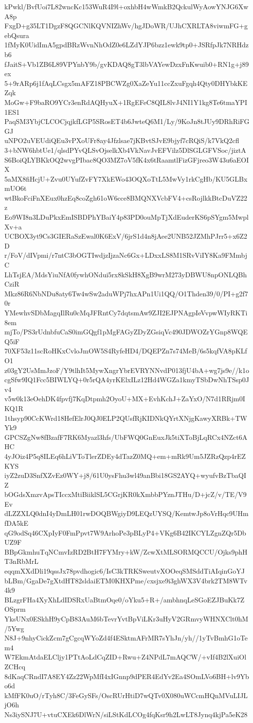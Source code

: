kPwkl/BvfUoi7L82wncKc153WuR4I9l+oxhbH4wWmkB2QckulWyAowYNJG6XwA8p
FxgD+g35LT1DgzF8QGCNlKQVNIZhWv/hgJDoWR/UJhCXRLTA8viwmFG+gebQsura
1fMyK0UidImA5gpdBRzWvnNhOdZ0e6LZdYJP6bzz1ewk9tp0+JSRfpJk7NRHdzb6
fJaitS+Vb1ZB6L89VPYnbY9b/gvKDAQ8gT3lbVAYewDzxFnKwuib0+RN1g+j89ex
5+9rARp6j1fAqLCsgx5mAFZ18PBCWZg0XaZeYu11ccZxuFgqh4Qty0DHYbkKEZqk
MoGw+F9baRO9YCr3enRdAQHyuX+1RgEFeC8QIL8lvJ4NI1Y1kg8Te6tmaYPI1ES1
PaqSM3YbjCLCOCjqjkfLGP5SRosET4b6JwteQ6M1/Ly/9KoJn8tJUy9DRhRiFGGJ
uNPO2uVEUdiQEu3vPXoUFr8ay4Jfzlsae7jKBvtSJvE9bjyf7cRQiS/k7VkQ2cfl
3+bNW6hbtUe1/qlsdPYvQLSvOjselkXb4VkNavJvEFVilz5DlSGLGFVSoc/jiztA
S6BoiQLYBKkOQ2wvgPIbac8QO3MZ7oV5fK4x6tRaamtlFizGFjreo3W43u6aEOIX
5aMX8fiHcjU+Zvu0UYufZvFY7XkEWo43OQXoTtL5MwVy1rkCgHb/KU5GLBxmUO6t
wtBkoFciFnXEux0hzEq8coZgh61oW6cce8BMQNXVcbFV4+csRojlkkBtcDuVZ22z
Eo9WI8n3LDuPkxEmISBDPhYBaiY4p83PD0ouMpTjXdEuderKS6pSYgm5MwplXv+a
UCBOX3yt9Cs3GIERaSzEwal0K6ExV/6jrS1d4n8jAee2UNB52JZMhPJrr5+x6Z2D
r/FoV/dIVpmi/r7ntC3bOGTIwdjzIjzaNc6Gx+LDxxLS8M1SRvViIY8Ka9FMmbjC
LhTsjEA/MdsYiuNfA0fywhONdui5rx8kSkH8XgB9wrM273yDBWU8npONLQBhCziR
Mkz86R6NbNDu8aty6Tw4wSw2aduWPj7hxAPn1Ui1QQ/O1Thden39/0/PI+g2f70r
YMewhvSDbMagqIlRu0cMqJFRntCy7dqtsmAw9ZJI2EJPNAgpIeVvpwWIyRKTi8em
mjTo/PS3rUdnbfuCaS0imGQgf1pMgFAGyZDyZGsiqVc490JDWOZrYGnp8WQEQ5iF
70XF53z11scRoHKxCvloJmOW5S4RyfeHD4/DQEPZn7s74MeB/6s5kqfVA8pKLfO1
z03gY2UsMmJzoF/Y9tlhIt5MywXngrYbrEVRYNNvdP013fjU4bA+wg7js9e//k1o
cgSfw9IQ1Fcc5BIWLYQ+0r5rQA4yrKElxILz12Hd4WGZa1kmyTSbDwNhTSsp0Jv4
v5w0k13eOehDK4fpvfj7KqDtpmh2OyoU+MX+EvhKchJ+ZaYxO/N7d1RRjm0IKQ1R
1thsyp90CcKWrd18HefElrJ0QJ0ELP2QUsfRjKIDNkQYrtXNjgKawyXRBk+TWYk9
GPCSZgNw8fBzafF7RK6Myazl3hfs/UbFWQ0GnEuxJk5tiXToBjLqRCx4NZct6AHC
4yJOiz4P5q8ILEq6hLiVToTlerZDEy4dTazZ0MQ+em+mRk9Um5JZRzQzp4rEZKYS
iyZ2zuD3SnfXZvEz0WY+j8/61U0ysFhu3wl49anBbi18GS2AYQ+wyufvBzTbaQIZ
bOGdsXmzvApsTIccxMtiBiiklSL5CGrjKR0kXmbbPYznJTHu/D+jcZ/v/TE/V9Ev
dLZZXLQ0dnI4yDmLH01rwDOQBWgiyD9LEQzUYSQ/KemtwJp8oVrHqc9UHmfDA5kE
qG9odSq46CXpIyF0FmPpvt7W9ArhoPe3pBLyP4+VKg6B42IKCYLZgnZQr5DbUZ9F
BBpGkmhuTqNCmvIzRD2BtH7FYMry+kW/ZcwXtMLSORMQCCU/Ojks9phHT3nRbMrL
eqqmXXdDli19qssJx78pvdhogic6/IsC3kTRKSweutvXOOeqSMSddTiAIqinGoYJ
bLBm/GgaDe7gXtdHT82sldaiETM0KHXPme/cxsjxe9i3ghWX3V4brk2TM8WTv4k9
BLzgrFHa4XyXhLdIDSRxUaBtmOqe0/oYku5+R+/ambhnqLeSGoEZJBuKk7ZOSprm
YksUNx0ESkhH9yCpB83AuM6bTevrYvtBpViLKr3uHyV2GRmvyWHNXClt0hM/5Ywg
N8J+9nhyCickZcm7gCgcqWYoZd4f4ESktmAFrMR7sYhJn/yh//1yTvBmhG1oTem4
W7EkmAtdaELCljy1PTtAoLdCqZID+Rwu+Z4NPdL7mAQCW/+vIf4B2lXuiOlZCHcq
8dKaqCRndI7A8EY4Zz22WpMfI4xIGnnp9dPER4EdYv2Ea4SOmLVo6BH+lv9Ybo6d
kMfFK0uO/rTyh8C/3FeGySFs/OscRUrHtiD7wQTv0X080uWCcmHQnMVuLIJLjO6h
Ns3iySNJ7U+vtuCXEk6DlWrN/siLStKdLCOg4fqKsr9h2LwLT8Jynq4kjPa5eK28
